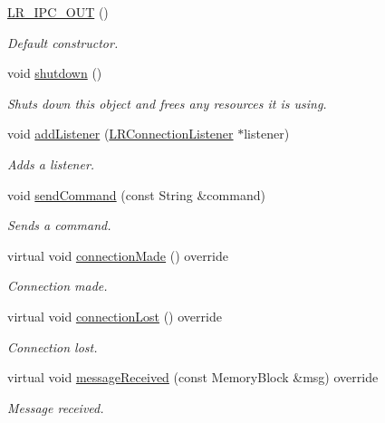 \begin{DoxyCompactItemize}
\item 
\hyperlink{class_l_r___i_p_c___o_u_t_a8842e5b48f3546b6269607aec979f916}{L\+R\+\_\+\+I\+P\+C\+\_\+\+O\+UT} ()
\begin{DoxyCompactList}\small\item\em Default constructor. \end{DoxyCompactList}\item 
void \hyperlink{class_l_r___i_p_c___o_u_t_a3a88e19600489b202fa50e4c10fcdcba}{shutdown} ()
\begin{DoxyCompactList}\small\item\em Shuts down this object and frees any resources it is using. \end{DoxyCompactList}\item 
void \hyperlink{class_l_r___i_p_c___o_u_t_adbfa161730bad89c9e761cf60b6909ad}{add\+Listener} (\hyperlink{class_l_r_connection_listener}{L\+R\+Connection\+Listener} $\ast$listener)
\begin{DoxyCompactList}\small\item\em Adds a listener. \end{DoxyCompactList}\item 
void \hyperlink{class_l_r___i_p_c___o_u_t_ad59cf75d5fef641f40adc9a354f584ff}{send\+Command} (const String \&command)
\begin{DoxyCompactList}\small\item\em Sends a command. \end{DoxyCompactList}\item 
virtual void \hyperlink{class_l_r___i_p_c___o_u_t_a4711a84655cbcdd923ce8f271109941e}{connection\+Made} () override
\begin{DoxyCompactList}\small\item\em Connection made. \end{DoxyCompactList}\item 
virtual void \hyperlink{class_l_r___i_p_c___o_u_t_a83d07e7eb695c511a5bcaa16341488f4}{connection\+Lost} () override
\begin{DoxyCompactList}\small\item\em Connection lost. \end{DoxyCompactList}\item 
virtual void \hyperlink{class_l_r___i_p_c___o_u_t_a7fcdee71f2811557b6bf4d1a6c8f243a}{message\+Received} (const Memory\+Block \&msg) override
\begin{DoxyCompactList}\small\item\em Message received. \end{DoxyCompactList}\item 

\end{DoxyCompactItemize}

